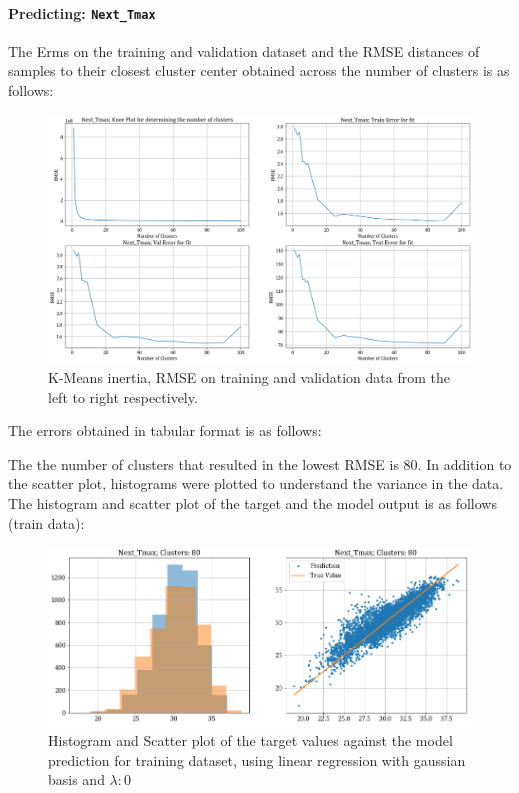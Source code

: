 \documentclass[12pt,a4paper]{article}
\newcommand{\noi}{\noindent}
\def\tt#1{\texttt{#1}}
\begin{document}
\paragraph{Predicting: \tt{Next\_Tmax}}
The Erms on the training and validation dataset and the RMSE distances of samples to their closest cluster center obtained across the number of clusters is as follows:
\begin{figure}[H]
     \centering
     \includegraphics[scale=0.4]{images/t3_d3/no_reg/tmax_errors.png}
     \caption{K-Means inertia, RMSE on training and validation data from the left to right respectively.}
\end{figure}

\vspace{-1em}
The errors obtained in tabular format is as follows:


\noi
The the number of clusters that resulted in the lowest RMSE is 80. In addition to the scatter plot, histograms were plotted to understand the variance in the data.\\

\noi
The histogram and scatter plot of the target and the model output is as follows (train data):
\begin{figure}[H]
     \centering
     \includegraphics[scale=0.49]{images/t3_d3/no_reg/T_max_nclu_80.png}
     \caption{Histogram and Scatter plot of the target values against the model prediction for training dataset, using linear regression with gaussian basis and $\lambda: 0$}
\end{figure}
\end{document}
